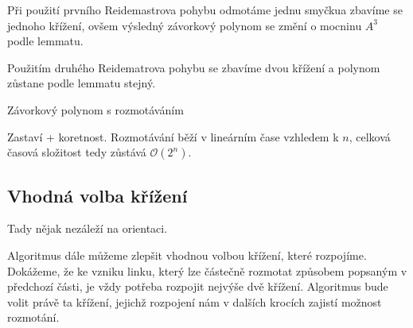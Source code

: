 Při použití prvního Reidemastrova pohybu odmotáme jednu smyčkua zbavíme se jednoho křížení, ovšem výsledný závorkový polynom se změní o mocninu $A^3$ podle lemmatu.

Použitím druhého Reidematrova pohybu se zbavíme dvou křížení a polynom zůstane podle lemmatu stejný.

\begin{algorithm}[H]

\DontPrintSemicolon

%




\caption{Závorkový polynom s rozmotáváním} 
\end{algorithm}

Zastaví + koretnost.
Rozmotávání běží v lineárním čase vzhledem k $n$, celková časová složitost tedy zůstává $\mathcal{O}(2^n)$.

\subsection{Vhodná volba křížení}
Tady nějak nezáleží na orientaci.

Algoritmus dále můžeme zlepšit vhodnou volbou křížení, které rozpojíme.
Dokážeme, že ke vzniku linku, který lze částečně rozmotat způsobem popsaným v předchozí části, je vždy potřeba rozpojit nejvýše dvě křížení.
Algoritmus bude volit právě ta křížení, jejichž rozpojení nám v dalších krocích zajistí možnost rozmotání.

